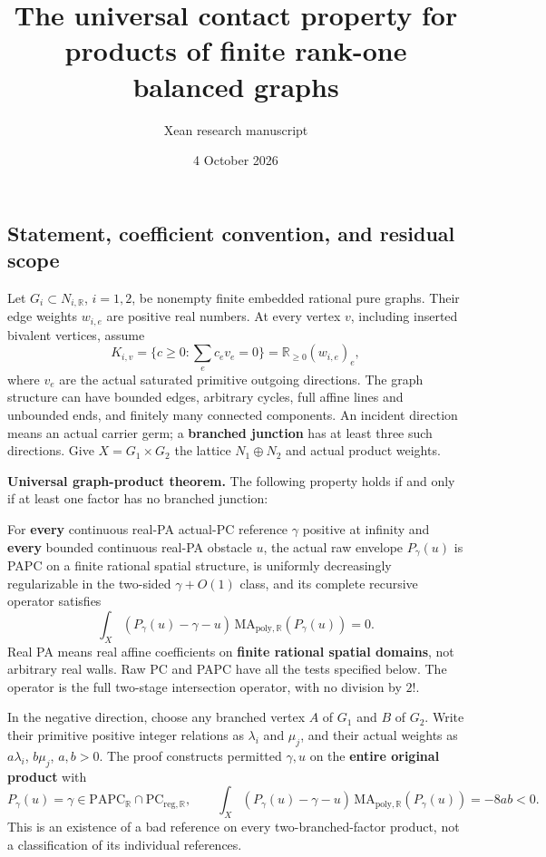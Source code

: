 \documentclass[
  11pt,
]{article}
\title{The universal contact property for products of finite rank-one
balanced graphs}
\author{Xean research manuscript}
\date{4 October 2026}
\begin{document}
\maketitle

\subsection{Statement, coefficient convention, and residual
scope}\label{statement-coefficient-convention-and-residual-scope}

Let \(G_i\subset N_{i,\mathbb{R}}\), \(i=1,2\), be nonempty finite
embedded rational pure graphs. Their edge weights \(w_{i,e}\) are
positive real numbers. At every vertex \(v\), including inserted
bivalent vertices, assume \[
 K_{i,v}=\{c\geq0:\sum_e c_e v_e=0\}
       =\mathbb{R}_{\geq0}(w_{i,e})_e,                         \tag{1}
\] where \(v_e\) are the actual saturated primitive outgoing directions.
The graph structure can have bounded edges, arbitrary cycles, full
affine lines and unbounded ends, and finitely many connected components.
An incident direction means an actual carrier germ; a \textbf{branched
junction} has at least three such directions. Give \(X=G_1\times G_2\)
the lattice \(N_1\oplus N_2\) and actual product weights.

\textbf{Universal graph-product theorem.} The following property
holds if and only if at least one factor has no branched junction:

For \textbf{every} continuous real-PA actual-PC reference \(\gamma\)
positive at infinity and \textbf{every} bounded continuous real-PA
obstacle \(u\), the actual raw envelope \(P_\gamma(u)\) is PAPC on a
finite rational spatial structure, is uniformly decreasingly
regularizable in the two-sided \(\gamma+O(1)\) class, and its complete
recursive operator satisfies \[
 \int_X(P_\gamma(u)-\gamma-u)\,
                \mathrm{MA}_{\mathrm{poly},\mathbb{R}}(P_\gamma(u))=0.
                                                               \tag{2}
\] Real PA means real affine coefficients on \textbf{finite rational
spatial domains}, not arbitrary real walls. Raw PC and PAPC have all the
tests specified below. The operator is the full two-stage intersection
operator, with no division by \(2!\).

In the negative direction, choose any branched vertex \(A\) of \(G_1\)
and \(B\) of \(G_2\). Write their primitive positive integer relations
as \(\lambda_i\) and \(\mu_j\), and their actual weights as
\(a\lambda_i\), \(b\mu_j\), \(a,b>0\). The proof constructs permitted
\(\gamma,u\) on the \textbf{entire original product} with \[
 P_\gamma(u)=\gamma\in\mathrm{PAPC}_{\mathbb{R}}
              \cap\mathrm{PC}_{\mathrm{reg},\mathbb{R}},\qquad
 \int_X(P_\gamma(u)-\gamma-u)\,\mathrm{MA}_{\mathrm{poly},\mathbb{R}}
                  (P_\gamma(u))=-8ab<0.                       \tag{3}
\] This is an existence of a bad reference on every two-branched-factor
product, not a classification of its individual references.
\end{document}
